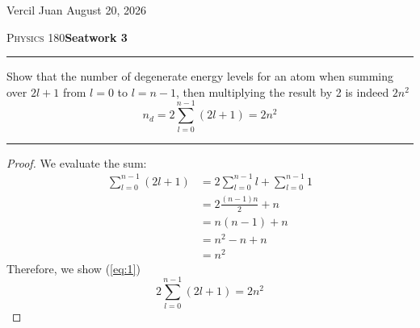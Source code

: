 \documentclass{article}
\begin{document}
	\noindent Vercil Juan \hfill August 20, 2026

	\noindent \textsc{Physics 180}\hfill \textbf{Seatwork 3}
	\vspace{1em}
	\hrule\vspace{5pt}
		Show that the number of degenerate energy levels 
		for an atom when summing over $2l+1$ from $l=0$ to 
		$l=n-1$, then multiplying the result by 2 is indeed 
		$2n^2$
		\begin{equation}\label{eq:1}
			n_d = 2\sum_{l=0}^{n-1}(2l+1) = 2n^2
		\end{equation}
	\hrule
	\begin{proof}

		We evaluate the sum:
		\begin{align*}
			\sum_{l=0}^{n-1}(2l+1) 
			&= 2\sum_{l=0}^{n-1} l + \sum_{l=0}^{n-1} 1\\
			&= 2 \frac{(n-1)n}{2} + n\\
			&= n(n-1) + n\\
			&= n^2 - n + n\\
			&= n^2
		\end{align*}
		Therefore, we show (\ref{eq:1})
		\begin{equation}
			\boxed{
				2 \sum_{l=0}^{n-1}(2l+1)  = 2n^2
			}
		\end{equation}
	\end{proof}
\end{document}
